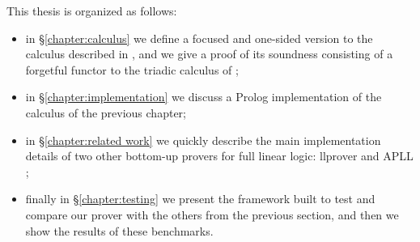 This thesis is organized as follows:
\begin{itemize}
	\item in \S\ref{chapter:calculus} we define a focused and one-sided version to the calculus described in \cite{HarlandPym}, and we give a proof of its soundness consisting of a forgetful functor to the triadic calculus of \cite{Focusing};
	\item in \S\ref{chapter:implementation} we discuss a Prolog implementation of the calculus of the previous chapter;
	\item in \S\ref{chapter:related work} we quickly describe the main implementation details of two other bottom-up provers for full linear logic: llprover \cite{llprover} and APLL \cite{APLL};
	\item finally in \S\ref{chapter:testing} we present the framework built to test and compare our prover with the others from the previous section, and then we show the results of these benchmarks.
\end{itemize}

